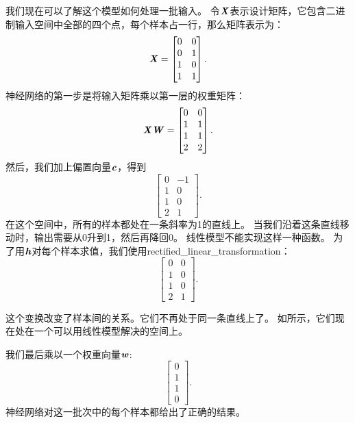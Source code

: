 我们现在可以了解这个模型如何处理一批输入。
令$\boldsymbol{\mathit{X}}$表示设计矩阵，它包含二进制输入空间中全部的四个点，每个样本占一行，那么矩阵表示为：
\begin{equation} 
\boldsymbol{\mathit{X}} = \begin{bmatrix}
0 & 0\\
0 & 1\\ 
1 & 0\\ 
1 & 1
\end{bmatrix}. 
\end{equation} 
神经网络的第一步是将输入矩阵乘以第一层的权重矩阵： 
\begin{equation}
\boldsymbol{\mathit{X}}\boldsymbol{\mathit{W}} = \begin{bmatrix} 
0 & 0\\ 
1 & 1\\ 
1 & 1\\ 
2 & 2 
\end{bmatrix}.
\end{equation} 
然后，我们加上偏置向量$\boldsymbol{\mathit{c}}$，得到 
\begin{equation} 
\begin{bmatrix} 
0 & -1\\
1 & 0\\ 
1 & 0\\ 
2 & 1 
\end{bmatrix}. 
\end{equation}
在这个空间中，所有的样本都处在一条斜率为1的直线上。
当我们沿着这条直线移动时，输出需要从0升到1，然后再降回0。
线性模型不能实现这样一种函数。
为了用$\boldsymbol{\mathit{h}}$对每个样本求值，我们使用\gls{rectified_linear_transformation}： 
\begin{equation}
\begin{bmatrix} 
0 & 0\\ 
1 & 0\\ 
1 & 0\\ 
2 & 1 
\end{bmatrix}. 
\end{equation}


这个变换改变了样本间的关系。它们不再处于同一条直线上了。
如所示，它们现在处在一个可以用线性模型解决的空间上。

我们最后乘以一个权重向量$\boldsymbol{\mathit{w}}$:
\begin{equation}
\begin{bmatrix}
0\\
1\\
1\\
0
\end{bmatrix}.
\end{equation}
神经网络对这一批次中的每个样本都给出了正确的结果。

